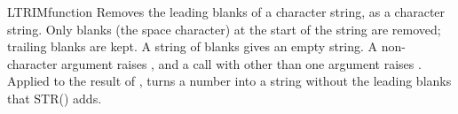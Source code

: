 \begin{XbaseEntry}{LTRIM}{function}
Removes the leading blanks of a character string, as a character string.
\Syntax
{}
\Usage
Only blanks (the space character) at the start of the string are removed; trailing blanks are kept. A string of blanks gives an empty string. A non-character argument raises , and a call with other than one argument raises .
\Tips
Applied to the result of ,  turns a number into a string without the leading blanks that STR() adds.
\Examples
{}
\end{XbaseEntry}

